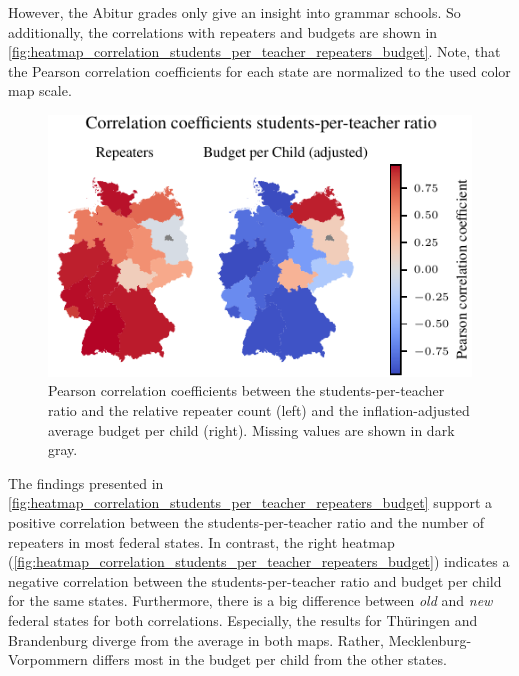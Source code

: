 However, the Abitur grades only give an insight into grammar schools. So additionally, the correlations with repeaters and budgets are shown in \autoref{fig:heatmap_correlation_students_per_teacher_repeaters_budget}. Note, that the Pearson correlation coefficients for each state are normalized to the used color map scale.

\begin{figure}[ht]
    \centering
    \includegraphics{fig/fig_heatmap_correlation_students_per_teacher_repeaters_budget.pdf}
    \caption{Pearson correlation coefficients between the students-per-teacher ratio and the relative repeater count (left) and the inflation-adjusted average budget per child (right). Missing values are shown in \textcolor{TUdark}{dark gray}.}
    \label{fig:heatmap_correlation_students_per_teacher_repeaters_budget}
\end{figure}

The findings presented in \autoref{fig:heatmap_correlation_students_per_teacher_repeaters_budget} support a  positive correlation between the students-per-teacher ratio and the number of repeaters in most federal states. In contrast, the right heatmap (\autoref{fig:heatmap_correlation_students_per_teacher_repeaters_budget}) indicates a negative correlation between the students-per-teacher ratio  and budget per child for the same states. Furthermore, there is a big difference between \emph{old} and \emph{new} federal states for both correlations. Especially, the results for Thüringen and Brandenburg diverge from the average in both maps. Rather, Mecklenburg-Vorpommern differs most in the budget per child from the other states.


